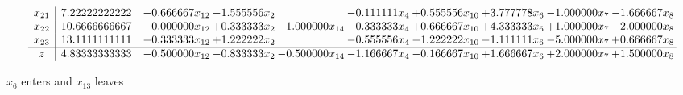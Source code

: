 \documentclass[10pt]{article}
\begin{document}
\[\begin{array}{c| c c@{\hskip 2pt} c@{\hskip 2pt} c@{\hskip 2pt} c@{\hskip 2pt} c@{\hskip 2pt} c@{\hskip 2pt} c@{\hskip 2pt} c@{\hskip 2pt} }
 x_{21}   &  7.22222222222 & -0.666667 x_{12} & -1.555556 x_{2} &   & -0.111111 x_{4} & + 0.555556 x_{10} & + 3.777778 x_{6} & -1.000000 x_{7} & -1.666667 x_{8}\\
 x_{22}   &  10.6666666667 & -0.000000 x_{12} & + 0.333333 x_{2} & -1.000000 x_{14} & -0.333333 x_{4} & + 0.666667 x_{10} & + 4.333333 x_{6} & + 1.000000 x_{7} & -2.000000 x_{8}\\
 x_{23}   &  13.1111111111 & -0.333333 x_{12} & + 1.222222 x_{2} &   & -0.555556 x_{4} & -1.222222 x_{10} & -1.111111 x_{6} & -5.000000 x_{7} & + 0.666667 x_{8}\\
\hline
z    &  4.83333333333 & -0.500000 x_{12} & -0.833333 x_{2} & -0.500000 x_{14} & -1.166667 x_{4} & -0.166667 x_{10} & + 1.666667 x_{6} & + 2.000000 x_{7} & + 1.500000 x_{8}\\
\end{array}\]


 $ x_{6} $ enters and $ x_{13} $ leaves 
\end{document}
